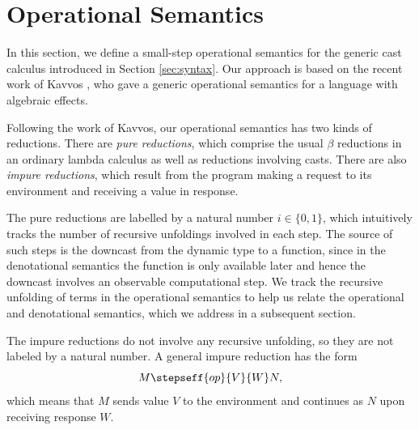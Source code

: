 \documentclass[acmsmall, screen]{acmart}
\theoremstyle{remark}
\begin{document}

\section{Operational Semantics}\label{sec:operational-semantics}

In this section, we define a small-step operational semantics for the generic
cast calculus introduced in Section \ref{sec:syntax}. Our approach is based on
the recent work of Kavvos \cite{TODO}, who gave a generic operational semantics
for a language with algebraic effects.

Following the work of Kavvos, our operational semantics has two kinds of
reductions. There are \emph{pure reductions}, which comprise the usual $\beta$
reductions in an ordinary lambda calculus as well as reductions involving casts.
There are also \emph{impure reductions}, which result from the program making a
request to its environment and receiving a value in response.

The pure reductions are labelled by a natural number $i \in \{0, 1\}$, which
intuitively tracks the number of recursive unfoldings involved in each step. The
source of such steps is the downcast from the dynamic type to a function, since
in the denotational semantics the function is only available later and hence the
downcast involves an observable computational step. We track the recursive
unfolding of terms in the operational semantics to help us relate the
operational and denotational semantics, which we address in a subsequent
section.
%

The impure reductions do not involve any recursive unfolding, so they are not
labeled by a natural number. A general impure reduction has the form
%
\[ M \stepseff{op}{V}{W} N, \]
%
which means that $M$ sends value $V$ to the environment and continues as $N$
upon receiving response $W$.

\end{document}
